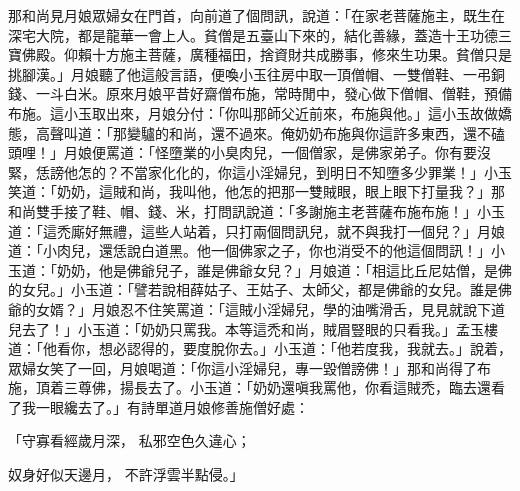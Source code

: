 那和尚見月娘眾婦女在門首，向前道了個問訊，說道：「在家老菩薩施主，既生在深宅大院，都是龍華一會上人。貧僧是五臺山下來的，結化善緣，蓋造十王功德三寶佛殿。仰賴十方施主菩薩，廣種福田，捨資財共成勝事，修來生功果。貧僧只是挑腳漢。」月娘聽了他這般言語，便喚小玉往房中取一頂僧帽、一雙僧鞋、一弔銅錢、一斗白米。原來月娘平昔好齋僧布施，常時閒中，發心做下僧帽、僧鞋，預備布施。這小玉取出來，月娘分付：「你叫那師父近前來，布施與他。」這小玉故做嬌態，高聲叫道：「那變驢的和尚，還不過來。俺奶奶布施與你這許多東西，還不磕頭哩！」月娘便罵道：「怪墮業的小臭肉兒，一個僧家，是佛家弟子。你有要沒緊，恁謗他怎的？不當家化化的，你這小淫婦兒，到明日不知墮多少罪業！」小玉笑道：「奶奶，這賊和尚，我叫他，他怎的把那一雙賊眼，眼上眼下打量我？」那和尚雙手接了鞋、帽、錢、米，打問訊說道：「多謝施主老菩薩布施布施！」小玉道：「這禿廝好無禮，這些人站着，只打兩個問訊兒，就不與我打一個兒？」月娘道：「小肉兒，還恁說白道黑。他一個佛家之子，你也消受不的他這個問訊！」小玉道：「奶奶，他是佛爺兒子，誰是佛爺女兒？」月娘道：「相這比丘尼姑僧，是佛的女兒。」小玉道：「譬若說相薛姑子、王姑子、太師父，都是佛爺的女兒。誰是佛爺的女婿？」月娘忍不住笑罵道：「這賊小淫婦兒，學的油嘴滑舌，見見就說下道兒去了！」小玉道：「奶奶只罵我。本等這禿和尚，賊眉豎眼的只看我。」孟玉樓道：「他看你，想必認得的，要度脫你去。」小玉道：「他若度我，我就去。」說着，眾婦女笑了一回，月娘喝道：「你這小淫婦兒，專一毀僧謗佛！」那和尚得了布施，頂着三尊佛，揚長去了。小玉道：「奶奶還嗔我罵他，你看這賊禿，臨去還看了我一眼纔去了。」有詩單道月娘修善施僧好處：

「守寡看經歲月深，  私邪空色久違心；

奴身好似天邊月，  不許浮雲半點侵。」

